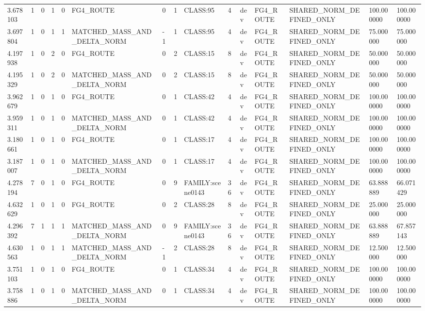 \begin{tabular}{lllllllllllllll}
3.678103 & 1 & 0 & 1 & 0 & FG4\_ROUTE & 0 & 1 & CLASS:95 & 4 & dev & FG4\_ROUTE & SHARED\_NORM\_DEFINED\_ONLY & 100.000000 & 100.000000 \\
3.697804 & 1 & 0 & 1 & 1 & MATCHED\_MASS\_AND\_DELTA\_NORM & -1 & 1 & CLASS:95 & 4 & dev & FG4\_ROUTE & SHARED\_NORM\_DEFINED\_ONLY & 75.000000 & 75.000000 \\
4.197938 & 1 & 0 & 2 & 0 & FG4\_ROUTE & 0 & 2 & CLASS:15 & 8 & dev & FG4\_ROUTE & SHARED\_NORM\_DEFINED\_ONLY & 50.000000 & 50.000000 \\
4.195329 & 1 & 0 & 2 & 0 & MATCHED\_MASS\_AND\_DELTA\_NORM & 0 & 2 & CLASS:15 & 8 & dev & FG4\_ROUTE & SHARED\_NORM\_DEFINED\_ONLY & 50.000000 & 50.000000 \\
3.962679 & 1 & 0 & 1 & 0 & FG4\_ROUTE & 0 & 1 & CLASS:42 & 4 & dev & FG4\_ROUTE & SHARED\_NORM\_DEFINED\_ONLY & 100.000000 & 100.000000 \\
3.959311 & 1 & 0 & 1 & 0 & MATCHED\_MASS\_AND\_DELTA\_NORM & 0 & 1 & CLASS:42 & 4 & dev & FG4\_ROUTE & SHARED\_NORM\_DEFINED\_ONLY & 100.000000 & 100.000000 \\
3.180661 & 1 & 0 & 1 & 0 & FG4\_ROUTE & 0 & 1 & CLASS:17 & 4 & dev & FG4\_ROUTE & SHARED\_NORM\_DEFINED\_ONLY & 100.000000 & 100.000000 \\
3.187007 & 1 & 0 & 1 & 0 & MATCHED\_MASS\_AND\_DELTA\_NORM & 0 & 1 & CLASS:17 & 4 & dev & FG4\_ROUTE & SHARED\_NORM\_DEFINED\_ONLY & 100.000000 & 100.000000 \\
4.278194 & 7 & 0 & 1 & 0 & FG4\_ROUTE & 0 & 9 & FAMILY:scene0143 & 36 & dev & FG4\_ROUTE & SHARED\_NORM\_DEFINED\_ONLY & 63.888889 & 66.071429 \\
4.632629 & 1 & 0 & 1 & 0 & FG4\_ROUTE & 0 & 2 & CLASS:28 & 8 & dev & FG4\_ROUTE & SHARED\_NORM\_DEFINED\_ONLY & 25.000000 & 25.000000 \\
4.296392 & 7 & 1 & 1 & 1 & MATCHED\_MASS\_AND\_DELTA\_NORM & 0 & 9 & FAMILY:scene0143 & 36 & dev & FG4\_ROUTE & SHARED\_NORM\_DEFINED\_ONLY & 63.888889 & 67.857143 \\
4.630563 & 1 & 0 & 1 & 1 & MATCHED\_MASS\_AND\_DELTA\_NORM & -1 & 2 & CLASS:28 & 8 & dev & FG4\_ROUTE & SHARED\_NORM\_DEFINED\_ONLY & 12.500000 & 12.500000 \\
3.751103 & 1 & 0 & 1 & 0 & FG4\_ROUTE & 0 & 1 & CLASS:34 & 4 & dev & FG4\_ROUTE & SHARED\_NORM\_DEFINED\_ONLY & 100.000000 & 100.000000 \\
3.758886 & 1 & 0 & 1 & 0 & MATCHED\_MASS\_AND\_DELTA\_NORM & 0 & 1 & CLASS:34 & 4 & dev & FG4\_ROUTE & SHARED\_NORM\_DEFINED\_ONLY & 100.000000 & 100.000000 \\

\end{tabular}
